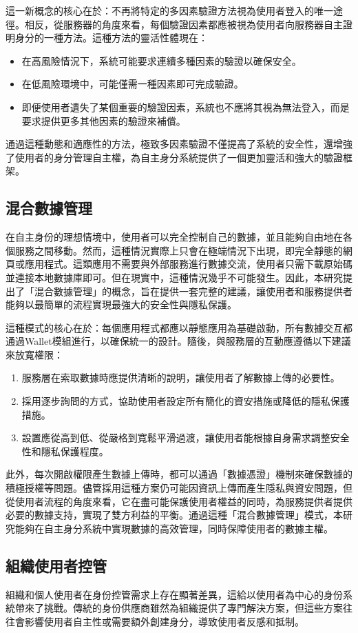 這一新概念的核心在於：不再將特定的多因素驗證方法視為使用者登入的唯一途徑。相反，從服務器的角度來看，每個驗證因素都應被視為使用者向服務器自主證明身分的一種方法。這種方法的靈活性體現在：
\begin{itemize}
  \item 在高風險情況下，系統可能要求連續多種因素的驗證以確保安全。
  \item 在低風險環境中，可能僅需一種因素即可完成驗證。
  \item 即便使用者遺失了某個重要的驗證因素，系統也不應將其視為無法登入，而是要求提供更多其他因素的驗證來補償。
\end{itemize}
通過這種動態和適應性的方法，極致多因素驗證不僅提高了系統的安全性，還增強了使用者的身分管理自主權，為自主身分系統提供了一個更加靈活和強大的驗證框架。
\subsection{混合數據管理}
在自主身份的理想情境中，使用者可以完全控制自己的數據，並且能夠自由地在各個服務之間移動。然而，這種情況實際上只會在極端情況下出現，即完全靜態的網頁或應用程式。這類應用不需要與外部服務進行數據交流，使用者只需下載原始碼並連接本地數據庫即可。但在現實中，這種情況幾乎不可能發生。因此，本研究提出了「混合數據管理」的概念，旨在提供一套完整的建議，讓使用者和服務提供者能夠以最簡單的流程實現最強大的安全性與隱私保護。

這種模式的核心在於：每個應用程式都應以靜態應用為基礎啟動，所有數據交互都通過Wallet模組進行，以確保統一的設計。隨後，與服務層的互動應遵循以下建議來放寬權限：
\begin{enumerate}
  \item 服務層在索取數據時應提供清晰的說明，讓使用者了解數據上傳的必要性。
  \item 採用逐步詢問的方式，協助使用者設定所有簡化的資安措施或降低的隱私保護措施。
  \item 設置應從高到低、從嚴格到寬鬆平滑過渡，讓使用者能根據自身需求調整安全性和隱私保護程度。
\end{enumerate}
此外，每次開啟權限產生數據上傳時，都可以通過「數據憑證」機制來確保數據的積極授權等問題。儘管採用這種方案仍可能因資訊上傳而產生隱私與資安問題，但從使用者流程的角度來看，它在盡可能保護使用者權益的同時，為服務提供者提供必要的數據支持，實現了雙方利益的平衡。通過這種「混合數據管理」模式，本研究能夠在自主身分系統中實現數據的高效管理，同時保障使用者的數據主權。
\subsection{組織使用者控管}
組織和個人使用者在身份控管需求上存在顯著差異，這給以使用者為中心的身份系統帶來了挑戰。傳統的身份供應商雖然為組織提供了專門解決方案，但這些方案往往會影響使用者自主性或需要額外創建身分，導致使用者反感和抵制。

